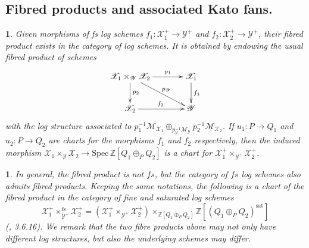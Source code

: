 \documentclass{amsart}%
\numberwithin{equation}{subsection}
\theoremstyle{plain2}
\theoremstyle{definition2}
\theoremstyle{stepstyle}
\theoremstyle{point}
\theoremstyle{subpoint}
\newtheorem{subpoint}[equation]{}%
\newcommand{\spa}[1]{\begin{subpoint}#1\end{subpoint}}           %
\newcommand{\Z}{\ensuremath{\mathbb{Z}}}
\newcommand{\cX}{\ensuremath{\mathscr{X}}}
\newcommand{\caM}{\ensuremath{\mathcal{M}}}
\newcommand{\cY}{\ensuremath{\mathscr{Y}}}
\renewcommand{\cY}{\ensuremath{\mathscr{Y}}}
\newcommand{\Spec}{\ensuremath{\mathrm{Spec}\,}}
\begin{document}
\subsection {Fibred products and associated Kato fans.}\label{sect fs product}
\spa{Given morphisms of \emph{fs} log schemes $f_1: \cX_1^+ \rightarrow \cY^+$ and $f_2: \cX_2^+ \rightarrow \cY^+$, their fibred product exists in the category of log schemes. It is obtained by endowing the usual fibred product of schemes
\begin{equation} \label{fibered product diagram}
\begin{gathered}
\xymatrixcolsep{3pc} \xymatrix{
  \cX_1\times_{\cY} \cX_2 \ar[r]^-{p_1} \ar[dr]^-{p_{\cY}} \ar[d]^-{p_2} & \cX_1 \ar[d]^{f_1}\\
  \cX_2 \ar[r]^{f_2}   & \cY
}
\end{gathered}
\end{equation}
with the log structure associated to $p_1^{-1}\caM_{\cX_1} \oplus_{p_{\cY}^{-1}\caM_{\cY}} p_2^{-1}\caM_{\cX_2}$. If $u_1:P \rightarrow Q_1$ and $u_2:P \rightarrow Q_2$ are charts for the morphisms $f_1$ and $f_2$ respectively, then the induced morphism $\cX_1\times_{\cY} \cX_2 \rightarrow \Spec \Z[Q_1 \oplus_P Q_2]$ is a chart for $\cX_1^+\times_{\cY^+} \cX_2^+$. }

\spa{In general, the fibred product is not $fs$, but the category of $fs$ log schemes also admits fibred products. Keeping the same notations, the following is a chart of the fibred product in the category of fine and saturated log schemes $$\cX_1^+\times_{\cY^+}^{\text{fs}} \cX_2^+ = (\cX_1^+\times_{\cY^+} \cX_2^+) \times_{\Z[Q_1 \oplus_P Q_2]} \Z[(Q_1 \oplus_P Q_2)^{\text{sat}}]$$(\cite{Bultot2015}, 3.6.16). We remark that the two fibre products above may not only have different log structures, but also the underlying schemes may differ.}
\end{document}

